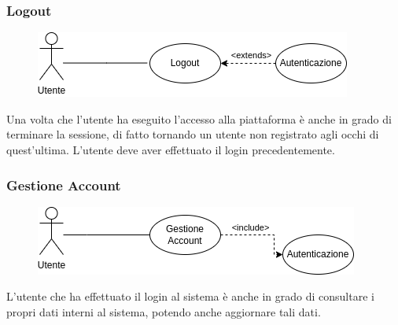 \documentclass{article}
\begin{document}
\clearpage

\subsubsection{Logout}\label{rf_6}
\begin{description}

	\begin{figure}[htp]
	\centering
	\includegraphics[]{rf6.png}
	\end{figure}

    \item Una volta che l'utente ha eseguito l'accesso alla piattaforma è anche in grado di terminare la sessione, di fatto tornando un utente non registrato agli occhi di quest'ultima. L'utente deve aver effettuato il login precedentemente. 
\end{description}


\renewcommand\thesubsubsection{RF 8}
\subsubsection{Gestione Account}\label{rf_8}
\begin{description}

	\begin{figure}[htp]
	\centering
	\includegraphics[]{rf8.png}
	\end{figure}	
	
    \item L'utente che ha effettuato il login al sistema è anche in grado di consultare i propri dati interni al sistema, potendo anche aggiornare tali dati.
\end{description}

\renewcommand\thesubsubsection{RF 9}
\end{document}
